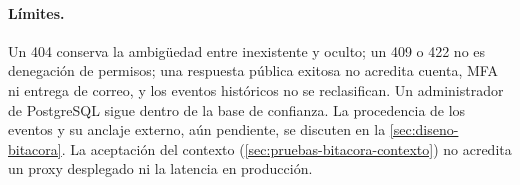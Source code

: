 \paragraph{Límites.} Un 404 conserva la ambigüedad entre inexistente y oculto;
un 409 o 422 no es denegación de permisos; una respuesta pública exitosa no
acredita cuenta, MFA ni entrega de correo, y los eventos históricos no se
reclasifican. Un administrador de PostgreSQL sigue dentro de la base de
confianza. La procedencia de los eventos y su anclaje externo, aún pendiente, se
discuten en la \cref{sec:diseno-bitacora}. La aceptación del contexto
(\cref{sec:pruebas-bitacora-contexto}) no acredita un proxy desplegado ni la
latencia en producción.

